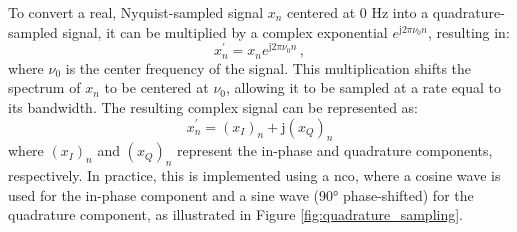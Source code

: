 To convert a real, Nyquist-sampled signal $x_n$ centered at 0 Hz into a quadrature-sampled signal, it can be multiplied by a complex exponential $e^{\mathrm{j}2\pi \nu_0 n}$, resulting in:
\begin{equation}
	\label{eq:quadrature_sampling}
	x^\prime_n = x_n e^{\mathrm{j}2\pi \nu_0 n} \, ,
\end{equation}
where $\nu_0$ is the center frequency of the signal. This multiplication shifts the spectrum of $x_n$ to be centered at $\nu_0$, allowing it to be sampled at a rate equal to its bandwidth. The resulting complex signal can be represented as:
\begin{equation}
	x^\prime_n = (x_I)_n + \mathrm{j} (x_Q)_n
	\label{eq:complex_signal}
\end{equation}
where $(x_I)_n$ and $(x_Q)_n$ represent the in-phase and quadrature components, respectively. In practice, this is implemented using a \gls{nco}, where a cosine wave is used for the in-phase component and a sine wave (90° phase-shifted) for the quadrature component, as illustrated in Figure \ref{fig:quadrature_sampling}.
